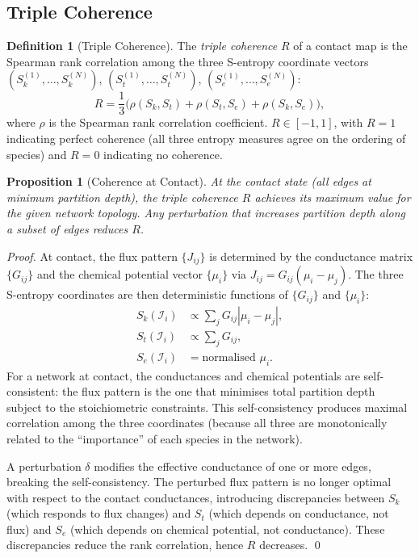 \documentclass[11pt,twocolumn]{article}
\theoremstyle{plain}
\newtheorem{proposition}[theorem]{Proposition}
\theoremstyle{definition}
\newtheorem{definition}[theorem]{Definition}
\newcommand{\Sk}{S_k}
\newcommand{\St}{S_t}
\newcommand{\Se}{S_e}
\begin{document}
\subsection{Triple Coherence}

\begin{definition}[Triple Coherence]
\label{def:triple_coherence}
The \emph{triple coherence} $R$ of a contact map is the Spearman rank
correlation \cite{spearman1904proof} among the three S-entropy coordinate
vectors $(\Sk^{(1)}, \ldots, \Sk^{(N)})$, $(\St^{(1)}, \ldots, \St^{(N)})$,
$(\Se^{(1)}, \ldots, \Se^{(N)})$:
\begin{equation}\label{eq:coherence}
  R = \frac{1}{3}\bigl(
    \rho(\Sk, \St) + \rho(\St, \Se) + \rho(\Sk, \Se)
  \bigr),
\end{equation}
where $\rho$ is the Spearman rank correlation coefficient. $R \in [-1, 1]$,
with $R = 1$ indicating perfect coherence (all three entropy measures agree on
the ordering of species) and $R = 0$ indicating no coherence.
\end{definition}

\begin{proposition}[Coherence at Contact]
\label{prop:coherence_contact}
At the contact state (all edges at minimum partition depth), the triple coherence
$R$ achieves its maximum value for the given network topology. Any perturbation
that increases partition depth along a subset of edges reduces $R$.
\end{proposition}

\begin{proof}
At contact, the flux pattern $\{J_{ij}\}$ is determined by the conductance
matrix $\{G_{ij}\}$ and the chemical potential vector $\{\mu_i\}$ via
$J_{ij} = G_{ij}(\mu_i - \mu_j)$. The three S-entropy coordinates are then
deterministic functions of $\{G_{ij}\}$ and $\{\mu_i\}$:
\begin{align}
  \Sk(\mathcal{I}_i) &\propto \sum_j G_{ij} |\mu_i - \mu_j|, \\
  \St(\mathcal{I}_i) &\propto \sum_j G_{ij}, \\
  \Se(\mathcal{I}_i) &= \text{normalised } \mu_i.
\end{align}
For a network at contact, the conductances and chemical potentials are
self-consistent: the flux pattern is the one that minimises total partition depth
subject to the stoichiometric constraints. This self-consistency produces maximal
correlation among the three coordinates (because all three are monotonically
related to the ``importance'' of each species in the network).

A perturbation $\delta$ modifies the effective conductance of one or more edges,
breaking the self-consistency. The perturbed flux pattern is no longer optimal
with respect to the contact conductances, introducing discrepancies between
$\Sk$ (which responds to flux changes) and $\St$ (which depends on
conductance, not flux) and $\Se$ (which depends on chemical potential, not
conductance). These discrepancies reduce the rank correlation, hence $R$
decreases. \qed
\end{proof}
\end{document}
